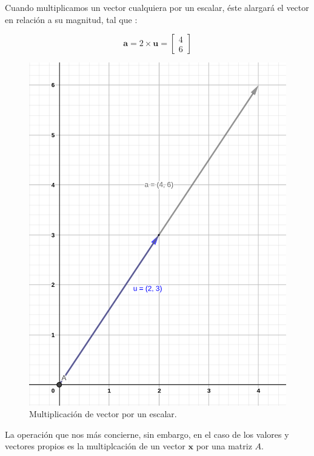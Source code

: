 \documentclass[
]{book}
\begin{document}
Cuando multiplicamos un vector cualquiera por un escalar, éste alargará el vector en relación a su magnitud, tal que :

\[
\mathbf{a} = 2 \times \mathbf{u} = \left[ \begin{array}{c} 4 \\ 6 \end{array} \right]
\]

\begin{figure}

{\centering \includegraphics[width=15.74in]{Unidad-V/Mult-vector} 

}

\caption{Multiplicación de vector por un escalar.}\label{fig:vector-escalar}
\end{figure}

La operación que nos más concierne, sin embargo, en el caso de los valores y vectores propios es la multiplcación de un vector \(\mathbf{x}\) por una matriz \(A\).
\end{document}
